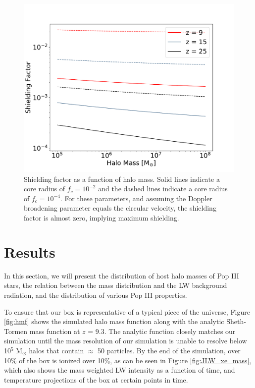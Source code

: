 \documentclass[a4paper,fleqn,usenatbib]{mnras}
\begin{document}
\begin{figure}
	\includegraphics[width=\columnwidth]{images/shield_mass.pdf}
    \caption{Shielding factor as a function of halo mass. Solid lines indicate a core radius of $f_{c} = 10^{-2}$ and the dashed lines indicate a core radius of $f_{c} = 10^{-4}$. For these parameters, and assuming the Doppler broadening parameter equals the circular velocity, the shielding factor is almost zero, implying maximum shielding.}
    \label{fig:shield_mass}
\end{figure}
\section{Results}
In this section, we will present the distribution of host halo masses of Pop III stars, the relation between the mass distribution and the LW background radiation, and the distribution of various Pop III properties.

To ensure that our box is representative of a typical piece of the universe, Figure \ref{fig:hmf} shows the simulated halo mass function along with the analytic Sheth-Tormen mass function at $z$ = 9.3. The analytic function closely matches our simulation until the mass resolution of our simulation is unable to resolve below 10$^{5}$ M$_{\odot}$ halos that contain $\approx$ 50 particles. By the end of the simulation, over 10\% of the box is ionized over 10\%, as can be seen in Figure \ref{fig:JLW_xe_mass}, which also shows the mass weighted LW intensity as a function of time, and temperature projections of the box at certain points in time. 
\end{document}
